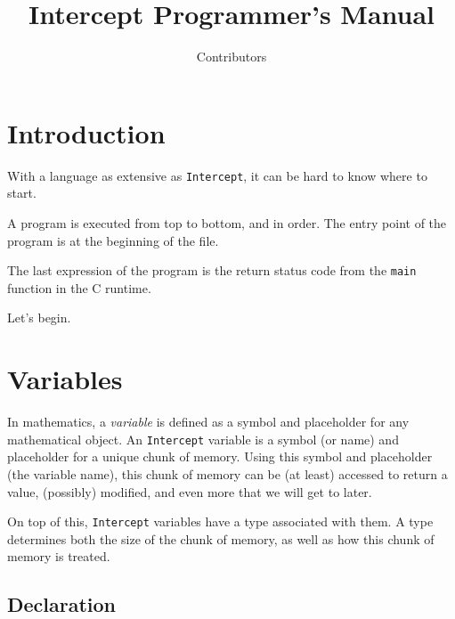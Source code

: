 \documentclass[12pt]{report}
\title  {Intercept Programmer's Manual}
\author {Contributors}
\begin{document}
\pagestyle{fancy}
\renewcommand{\chaptermark}[1]{\markboth{#1}{#1}}
\fancyhf{}
\fancyhead[C]{\leftmark}
\fancyfoot[C]{\thepage}

\hypersetup{pageanchor=false}
\begin{titlepage}
  \maketitle
\end{titlepage}

\chapter{Introduction}
\label{chpt:intro}

With a language as extensive as \verb|Intercept|, it can be hard to know where to start.

A program is executed from top to bottom, and in order. The entry point of the program is at the beginning of the file.

The last expression of the program is the return status code from the \verb|main| function in the C runtime.

Let's begin.

\chapter{Variables}
\label{chpt:variables}

In mathematics, a \emph{variable} is defined as a symbol and placeholder for any mathematical object. An \verb|Intercept| variable is a symbol (or name) and placeholder for a unique chunk of memory. Using this symbol and placeholder (the variable name), this chunk of memory can be (at least) accessed to return a value, (possibly) modified, and even more that we will get to later.

On top of this, \verb|Intercept| variables have a type associated with them. A type determines both the size of the chunk of memory, as well as how this chunk of memory is treated.

\section*{Declaration}
\label{sec:variables-declaration}
\end{document}
